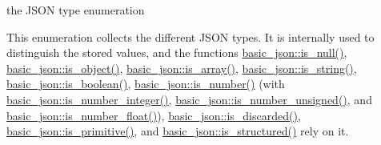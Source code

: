 the J\+S\+ON type enumeration 

This enumeration collects the different J\+S\+ON types. It is internally used to distinguish the stored values, and the functions \hyperlink{classnlohmann_1_1basic__json_a8faa039ca82427ed29c486ffd00600c3}{basic\+\_\+json\+::is\+\_\+null()}, \hyperlink{classnlohmann_1_1basic__json_af8f511af124e82e4579f444b4175787c}{basic\+\_\+json\+::is\+\_\+object()}, \hyperlink{classnlohmann_1_1basic__json_aef9ce5dd2381caee1f8ddcdb5bdd9c65}{basic\+\_\+json\+::is\+\_\+array()}, \hyperlink{classnlohmann_1_1basic__json_a69b596a4a6683b362095c9a139637396}{basic\+\_\+json\+::is\+\_\+string()}, \hyperlink{classnlohmann_1_1basic__json_a943e8cb182d0f2365c76d64b42eaa6fd}{basic\+\_\+json\+::is\+\_\+boolean()}, \hyperlink{classnlohmann_1_1basic__json_a2b9852390abb4b1ef5fac6984e2fc0f3}{basic\+\_\+json\+::is\+\_\+number()} (with \hyperlink{classnlohmann_1_1basic__json_abac8af76067f1e8fdca9052882c74428}{basic\+\_\+json\+::is\+\_\+number\+\_\+integer()}, \hyperlink{classnlohmann_1_1basic__json_abc7378cba0613a78b9aad1c8e7044bb0}{basic\+\_\+json\+::is\+\_\+number\+\_\+unsigned()}, and \hyperlink{classnlohmann_1_1basic__json_a33b4bf898b857c962e798fc7f6e86e70}{basic\+\_\+json\+::is\+\_\+number\+\_\+float()}), \hyperlink{classnlohmann_1_1basic__json_aabe623bc8304c2ba92d96d91f390fab4}{basic\+\_\+json\+::is\+\_\+discarded()}, \hyperlink{classnlohmann_1_1basic__json_a6362b88718eb5c6d4fed6a61eed44b95}{basic\+\_\+json\+::is\+\_\+primitive()}, and \hyperlink{classnlohmann_1_1basic__json_a9f68a0af820c3ced7f9d17851ce4c22d}{basic\+\_\+json\+::is\+\_\+structured()} rely on it.

